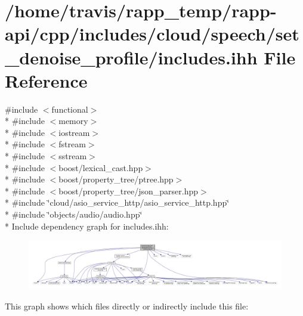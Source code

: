 \hypertarget{cloud_2speech_2set__denoise__profile_2includes_8ihh}{\section{/home/travis/rapp\-\_\-temp/rapp-\/api/cpp/includes/cloud/speech/set\-\_\-denoise\-\_\-profile/includes.ihh File Reference}
\label{cloud_2speech_2set__denoise__profile_2includes_8ihh}
}
{\ttfamily \#include $<$functional$>$}\\*
{\ttfamily \#include $<$memory$>$}\\*
{\ttfamily \#include $<$iostream$>$}\\*
{\ttfamily \#include $<$fstream$>$}\\*
{\ttfamily \#include $<$sstream$>$}\\*
{\ttfamily \#include $<$boost/lexical\-\_\-cast.\-hpp$>$}\\*
{\ttfamily \#include $<$boost/property\-\_\-tree/ptree.\-hpp$>$}\\*
{\ttfamily \#include $<$boost/property\-\_\-tree/json\-\_\-parser.\-hpp$>$}\\*
{\ttfamily \#include \char`\"{}cloud/asio\-\_\-service\-\_\-http/asio\-\_\-service\-\_\-http.\-hpp\char`\"{}}\\*
{\ttfamily \#include \char`\"{}objects/audio/audio.\-hpp\char`\"{}}\\*
Include dependency graph for includes.\-ihh\-:
\nopagebreak
\begin{figure}[H]
\begin{center}
\leavevmode
\includegraphics[width=350pt]{cloud_2speech_2set__denoise__profile_2includes_8ihh__incl}
\end{center}
\end{figure}
This graph shows which files directly or indirectly include this file\-:
\nopagebreak
